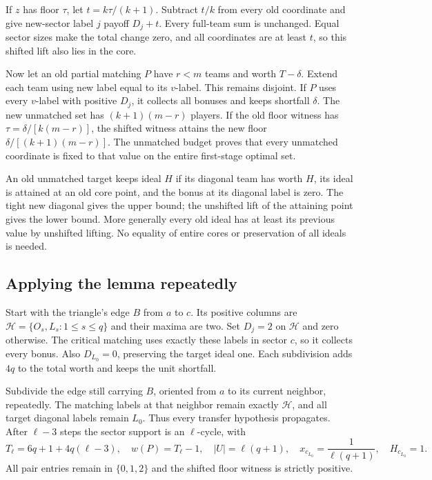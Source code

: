 \documentclass[11pt]{article}
\theoremstyle{remark}\newtheorem{remark}[theorem]{Remark}
\begin{document}
If $z$ has floor $\tau$, let $t=k\tau/(k+1)$. Subtract $t/k$ from every old
coordinate and give new-sector label $j$ payoff $D_j+t$. Every full-team
sum is unchanged. Equal sector sizes make the total change zero, and all
coordinates are at least $t$, so this shifted lift also lies in the core.

Now let an old partial matching $P$ have $r<m$ teams and worth $T-\delta$.
Extend each team using new label equal to its $v$-label. This remains
disjoint. If $P$ uses every $v$-label with positive $D_j$, it collects all
bonuses and keeps shortfall $\delta$. The new unmatched set has
$(k+1)(m-r)$ players. If the old floor witness has
$\tau=\delta/[k(m-r)]$, the shifted witness attains the new floor
$\delta/[(k+1)(m-r)]$. The unmatched budget proves that every unmatched
coordinate is fixed to that value on the entire first-stage optimal set.

An old unmatched target keeps ideal $H$ if its diagonal team has worth
$H$, its ideal is attained at an old core point, and the bonus at its
diagonal label is zero. The tight new diagonal gives the upper bound;
the unshifted lift of the attaining point gives the lower bound. More
generally every old ideal has at least its previous value by unshifted
lifting. No equality of entire cores or preservation of all ideals is needed.

\subsection{Applying the lemma repeatedly}
Start with the triangle's edge $B$ from $a$ to $c$. Its positive columns
are $\mathcal H=\{O_s,L_s:1\le s\le q\}$ and their maxima are two.
Set $D_j=2$ on $\mathcal H$ and zero otherwise. The critical matching
uses exactly these labels in sector $c$, so it collects every bonus.
Also $D_{L_0}=0$, preserving the target ideal one. Each subdivision adds
$4q$ to the total worth and keeps the unit shortfall.

Subdivide the edge still carrying $B$, oriented from $a$ to its current
neighbor, repeatedly. The matching labels at that neighbor remain exactly
$\mathcal H$, and all target diagonal labels remain $L_0$. Thus every
transfer hypothesis propagates. After $\ell-3$ steps the sector support is
an $\ell$-cycle, with
\[
 T_\ell=6q+1+4q(\ell-3),\quad w(P)=T_\ell-1,\quad
 |U|=\ell(q+1),\quad x_{c_{L_0}}=\frac1{\ell(q+1)},\quad H_{c_{L_0}}=1.
\]
All pair entries remain in $\{0,1,2\}$ and the shifted floor witness is
strictly positive.
\end{document}
